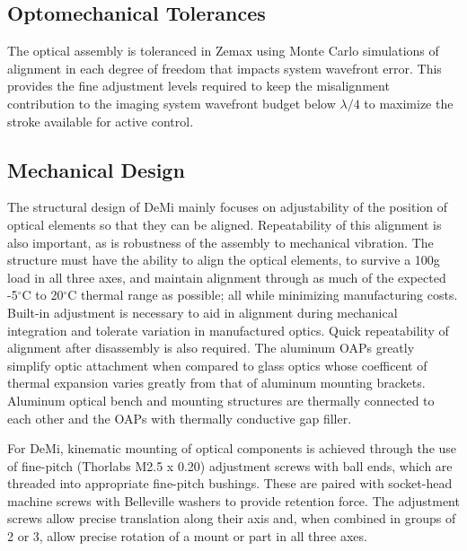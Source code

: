 \documentclass[]{spie}  %
\begin{document}
\subsection{Optomechanical Tolerances}
The optical assembly is toleranced in Zemax using Monte Carlo simulations of alignment in each degree of freedom that impacts system wavefront error.
This provides the fine adjustment levels required to keep the misalignment contribution to the imaging system wavefront budget below  $\lambda/4$ to maximize the stroke available for active control. %


\subsection{Mechanical Design} %
The structural design of DeMi mainly focuses on adjustability of the position of optical elements so that they can be aligned. Repeatability of this alignment is also important, as is robustness of the assembly to mechanical vibration. The structure must have the ability to align the optical elements, to survive a 100g load in all three axes, and maintain alignment through as much of the expected -5$^\circ$C to 20$^\circ$C thermal range as possible; all while minimizing manufacturing costs. Built-in adjustment is necessary to aid in alignment during mechanical integration and tolerate variation in manufactured optics. 
Quick repeatability of alignment after disassembly is also required. The aluminum OAPs greatly simplify optic attachment when compared to glass optics whose coefficent of thermal expansion varies greatly from that of aluminum mounting brackets.
Aluminum optical bench and mounting structures are thermally connected to each other and the OAPs with thermally conductive gap filler.


For DeMi, kinematic mounting of optical components is achieved through the use of fine-pitch (Thorlabs M2.5 x 0.20) adjustment screws with ball ends, which are threaded into appropriate fine-pitch bushings. These are paired with socket-head machine screws with Belleville washers to provide retention force. The adjustment screws allow precise translation along their axis and, when combined in groups of 2 or 3, allow precise rotation of a mount or part in all three axes.
\end{document}
